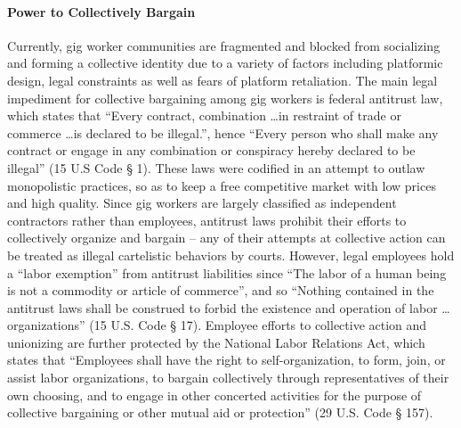 \paragraph{Power to Collectively Bargain}
Currently, gig worker communities are fragmented and blocked from socializing and forming a collective identity due to a variety of factors including platformic design, legal constraints as well as fears of platform retaliation. The main legal impediment for collective bargaining among gig workers is federal antitrust law, which states that ``Every contract, combination \dots in restraint of trade or commerce \dots is declared to be illegal.'', hence ``Every person who shall make any contract or engage in any combination or conspiracy hereby declared to be illegal'' (15 U.S Code § 1). These laws were codified in an attempt to outlaw monopolistic practices, so as to keep a free competitive market with low prices and high quality. Since gig workers are largely classified as independent contractors rather than employees, antitrust laws prohibit their efforts to collectively organize and bargain – any of their attempts at collective action can be treated as illegal cartelistic behaviors by courts. However, legal employees hold a ``labor exemption'' from antitrust liabilities since ``The labor of a human being is not a commodity or article of commerce'', and so ``Nothing contained in the antitrust laws shall be construed to forbid the existence and operation of labor \dots organizations'' (15 U.S. Code § 17). Employee efforts to collective action and unionizing are further protected by the National Labor Relations Act, which states that ``Employees shall have the right to self-organization, to form, join, or assist labor organizations, to bargain collectively through representatives of their own choosing, and to engage in other concerted activities for the purpose of collective bargaining or other mutual aid or protection'' (29 U.S. Code § 157). 

